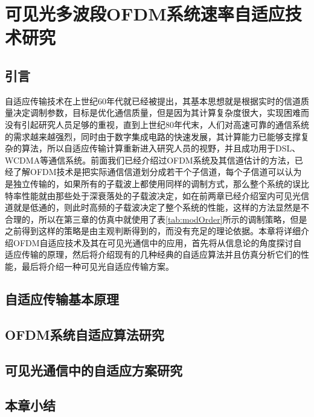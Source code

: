 \chapter{可见光多波段OFDM系统速率自适应技术研究}
\section{引言}
自适应传输技术在上世纪60年代就已经被提出，其基本思想就是根据实时的信道质量决定调制参数，目标是优化通信质量，但是因为其计算复杂度很大，实现困难而没有引起研究人员足够的重视\cite{徐凌峰2007ofdm}，直到上世纪80年代末，人们对高速可靠的通信系统的需求越来越强烈，同时由于数字集成电路的快速发展，其计算能力已能够支撑复杂的算法，所以自适应传输计算重新进入研究人员的视野，并且成功用于DSL、WCDMA等通信系统。前面我们已经介绍过OFDM系统及其信道估计的方法，已经了解OFDM技术是把实际通信信道划分成若干个子信道，每个子信道可以认为是独立传输的，如果所有的子载波上都使用同样的调制方式，那么整个系统的误比特率性能就由那些处于深衰落处的子载波决定，如在前两章已经介绍室内可见光信道就是低通的，则此时高频的子载波决定了整个系统的性能，这样的方法显然是不合理的，所以在第三章的仿真中就使用了表\ref{tab:modOrder}所示的调制策略，但是之前得到这样的策略是由主观判断得到的，而没有充足的理论依据。本章将详细介绍OFDM自适应技术及其在可见光通信中的应用，首先将从信息论的角度探讨自适应传输的原理，然后将介绍现有的几种经典的自适应算法并且仿真分析它们的性能，最后将介绍一种可见光自适应传输方案。
\section{自适应传输基本原理}
\section{OFDM系统自适应算法研究}
\section{可见光通信中的自适应方案研究}
\section{本章小结}